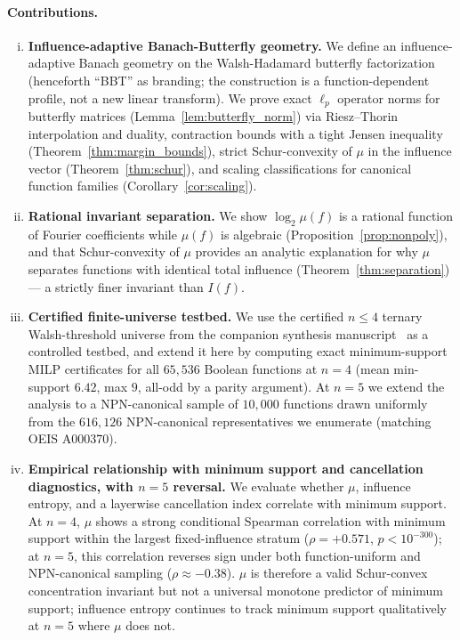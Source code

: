 \documentclass[11pt]{article}
\begin{document}
\paragraph{Contributions.}
\begin{enumerate}[(i)]
    \item \textbf{Influence-adaptive Banach-Butterfly geometry.} We define an influence-adaptive Banach geometry on the Walsh-Hadamard butterfly factorization (henceforth ``BBT'' as branding; the construction is a function-dependent profile, not a new linear transform). We prove exact $\ell_p$ operator norms for butterfly matrices (Lemma~\ref{lem:butterfly_norm}) via Riesz--Thorin interpolation and duality, contraction bounds with a tight Jensen inequality (Theorem~\ref{thm:margin_bounds}), strict Schur-convexity of $\mu$ in the influence vector (Theorem~\ref{thm:schur}), and scaling classifications for canonical function families (Corollary~\ref{cor:scaling}).

    \item \textbf{Rational invariant separation.} We show $\log_2\mu(f)$ is a rational function of Fourier coefficients while $\mu(f)$ is algebraic (Proposition~\ref{prop:nonpoly}), and that Schur-convexity of $\mu$ provides an analytic explanation for why $\mu$ separates functions with identical total influence (Theorem~\ref{thm:separation}) --- a strictly finer invariant than $I(f)$.

    \item \textbf{Certified finite-universe testbed.} We use the certified $n \le 4$ ternary Walsh-threshold universe from the companion synthesis manuscript~\cite{spectralSynthesisCompanion} as a controlled testbed, and extend it here by computing exact minimum-support MILP certificates for all $65{,}536$ Boolean functions at $n=4$ (mean min-support $6.42$, max $9$, all-odd by a parity argument). At $n=5$ we extend the analysis to a NPN-canonical sample of $10{,}000$ functions drawn uniformly from the $616{,}126$ NPN-canonical representatives we enumerate (matching OEIS A000370).

    \item \textbf{Empirical relationship with minimum support and cancellation diagnostics, with $n=5$ reversal.} We evaluate whether $\mu$, influence entropy, and a layerwise cancellation index correlate with minimum support. At $n=4$, $\mu$ shows a strong conditional Spearman correlation with minimum support within the largest fixed-influence stratum ($\rho = +0.571$, $p < 10^{-300}$); at $n=5$, this correlation reverses sign under both function-uniform and NPN-canonical sampling ($\rho \approx -0.38$). $\mu$ is therefore a valid Schur-convex concentration invariant but not a universal monotone predictor of minimum support; influence entropy continues to track minimum support qualitatively at $n=5$ where $\mu$ does not.


\end{enumerate}
\end{document}
